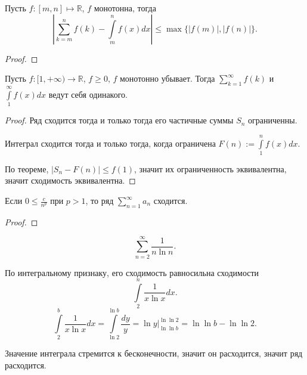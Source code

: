 \TODO
\begin{theorem} \thmslashn

    Пусть $f : [m, n] \mapsto \mathbb{R}$, $f$ монотонна, тогда
    \[ \left| \sum\limits_{k=m}^{n} f(k) - \int\limits_{m}^{n} f(x)dx\right| \le \max \{|f(m)|, |f(n)|\}    .\]
    \begin{proof} \thmslashn
    
        \TODO
    \end{proof}
\end{theorem}
\begin{theorem} \thmslashn

    Пусть $f : [1, +\infty) \to \mathbb{R}$, $f \ge 0$, $f$ монотонно убывает. Тогда $\sum\limits_{k=1}^{\infty} f(k)$ и $\int\limits_{1}^{\infty}  f(x)dx$ ведут себя одинакого.
    \begin{proof} \thmslashn
    
        Ряд сходится тогда и только тогда его частичные суммы $S_{n}$ ограниченны.

        Интеграл сходится тогда и только тогда, когда ограничена $F(n) := \int\limits_{1}^{n} f(x)dx$.

        По теореме, $\left| S_{n} - F(n)\right| \le f(1)$, значит их ограниченность эквивалентна, значит сходимость эквивалентна.
    \end{proof}
\end{theorem}
\begin{consequence} \thmslashn

    Если $0 \le \frac{c}{n^{p}}$ при $p > 1$, то ряд $\sum\limits_{n=1}^{\infty} a_{n}$ сходится.
    \begin{proof} \thmslashn
    
        \TODO
    \end{proof}
\end{consequence}
\begin{example} \thmslashn

    \[ \sum\limits_{n=2}^{\infty} \frac{1}{n\ln n} .\]

    По интегральному признаку, его сходимость равносильна сходимости
    \[ \int\limits_{2}^{n} \frac{1}{x\ln x}dx   .\]
    \[ \int\limits_{2}^{b} \frac{1}{x\ln x}dx = \int\limits_{\ln 2}^{\ln b} \frac{dy}{y} = \left. \ln y\right|_{\ln \ln b}^{\ln \ln 2} = \ln\ln b - \ln\ln 2     .\]

    Значение интеграла стремится к бесконечности, значит он расходится, значит ряд расходится.
\end{example}
